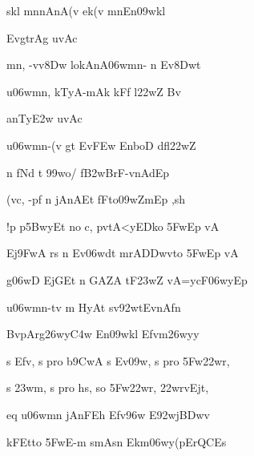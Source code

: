 {\dn skl\2 mnnAnA(v\? ek(v\? mnEn\309wkl \vegdn\dontdisplaylinenum}



{\dn EvgtrAg uvAc{\dandabdn}\dontdisplaylinenum }

{\dn mn, -vv\?\38Dw\2 lokAnA\306wmn- n Ev\38Dwt\?{\dandadn} \dontdisplaylinenum}

{\dn u\306wmn, kTyA-mAk\2 kFf\2 l\322wZ\2 Bv\? \vegdn\dontdisplaylinenum}

{\dn anT\0y\3E2w uvAc{\dandabdn}\dontdisplaylinenum }

{\dn u\306wmn-(v\2 gt\? Ev\3FEw EnboD dfl\322wZ \dontdisplaylinenum}

{\dn n fNd\2 t\? \399wo/\2 f\3B2wB\?rF-vnAdEp \vegdn\dontdisplaylinenum}

{\dn (vc, -pf{\rdt} n jAnAEt fFto\309wZmEp ,sh \dontdisplaylinenum}

{\dn !p\2 p\35BwyEt no c, pv\0tA<yEDko \35FwEp vA \vegdn\dontdisplaylinenum}

{\dn Ej\39FwA rs\2 n Ev\306wd\?t mrA\3DDwvto \35FwEp vA{\dandabdn} \dontdisplaylinenum}

{\dn g\306wD\2 EjG\5Et n G\5AZA tF\323wZ\2 vA=ycF\306wyEp \vegdn\dontdisplaylinenum}

{\dn u\306wmn-tv m\? HyAt\2 sv\0\392w\4tEvnAfn \dontdisplaylinenum}

{\dn BvpArg\326wy\3C4w\2 En\309wkl\2 Efvm\326wyy \vegdn\dontdisplaylinenum}

{\dn s Efv, s pro b\5\39CwA s Ev\309w, s pro \35Fw\322wr,{\dandabdn} \dontdisplaylinenum}

{\dn s \323wm, s pro h\2s, so \35Fw\322wr, \322wrvEj\0t, \vegdn\dontdisplaylinenum}

{\dn eq u\306wmn jAnFEh Efv\396w E\392wj\3BDwv{\dandabdn} \dontdisplaylinenum}

{\dn kFEt\0to \35FwE-m smAs\?n Ekm\306wy(pErQCEs \vegdn\dontdisplaylinenum}

